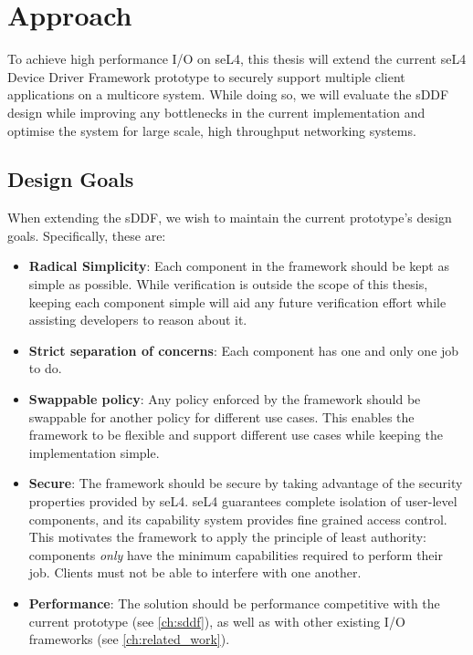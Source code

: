\chapter{Approach}\label{ch:approach}
To achieve high performance I/O on seL4, this thesis will extend the current seL4 Device Driver Framework prototype 
to securely support multiple client applications on a multicore system. While doing so, 
we will evaluate the sDDF design while improving any bottlenecks in the current implementation
and optimise the system for large scale, high throughput networking systems.

\section{Design Goals}
When extending the sDDF, we wish to maintain the current prototype's design goals. 
Specifically, these are:
\begin{itemize}
\item \textbf{Radical Simplicity}: Each component in the framework should be kept as simple as possible. While verification is outside the scope
of this thesis, keeping each component simple will aid any future verification effort while assisting developers to reason about it.
\item \textbf{Strict separation of concerns}: Each component has one and only one job to do. 
\item \textbf{Swappable policy}: Any policy enforced by the framework should be swappable for another policy for different use cases.
This enables the framework to be flexible and support different use cases while keeping the implementation simple.
\item \textbf{Secure}: The framework should be secure by taking advantage of the security properties provided by seL4. seL4 guarantees
complete isolation of user-level components, and its capability system provides fine grained access control. This motivates the framework to apply
the principle of least authority: components \emph{only} have the minimum capabilities required to perform their job. Clients must not be able
to interfere with one another. 
\item \textbf{Performance}: The solution should be performance competitive with the current prototype (see \autoref{ch:sddf}),
as well as with other existing I/O frameworks (see \autoref{ch:related_work}).
\end{itemize}

